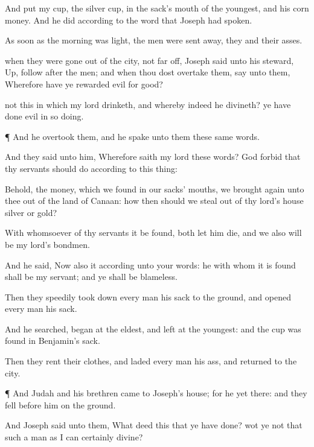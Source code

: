 {And
put my
cup, the
silver
cup, in the
sack’s
mouth of the
youngest, and his
corn
money. And he
did according to the
word that
Joseph had
spoken.

As soon as the
morning was
light, the
men were sent
away, they and their
asses.

 when they were gone
out of the
city,
{} not
{} far
off,
Joseph
said unto his
steward,
Up,
follow
after the
men; and when thou dost
overtake them,
say unto them, Wherefore have ye
rewarded
evil for
good?

 not this
{} in which my
lord
drinketh, and whereby
indeed he
divineth? ye have done
evil in so
doing.


\par }{\PP {}¶ And he
overtook them, and he
spake unto them these
same
words.

And they
said unto him, Wherefore
saith my
lord these
words? God
forbid that thy
servants should
do according to this
thing:

Behold, the
money, which we
found in our
sacks’
mouths, we brought
again unto thee out of the
land of
Canaan: how then should we
steal out of thy
lord’s
house
silver or
gold?

With whomsoever of thy
servants it be
found, both let him
die, and we also will be my
lord’s
bondmen.

And he
said, Now also
{} it
{} according unto your
words: he with whom it is
found shall be my
servant; and ye shall be
blameless.

Then they
speedily took
down every
man his
sack to the
ground, and
opened every
man his
sack.

And he
searched,
{}
began at the
eldest, and
left at the
youngest: and the
cup was
found in
Benjamin’s
sack.

Then they
rent their
clothes, and
laded every
man his
ass, and
returned to the
city.


\par }{\PP {}¶ And
Judah and his
brethren
came to
Joseph’s
house; for he
{} yet there: and they
fell before
him on the
ground.

And
Joseph
said unto them, What
deed
{} this that ye have
done? wot
ye not that such a
man as I can
certainly
divine?

}
